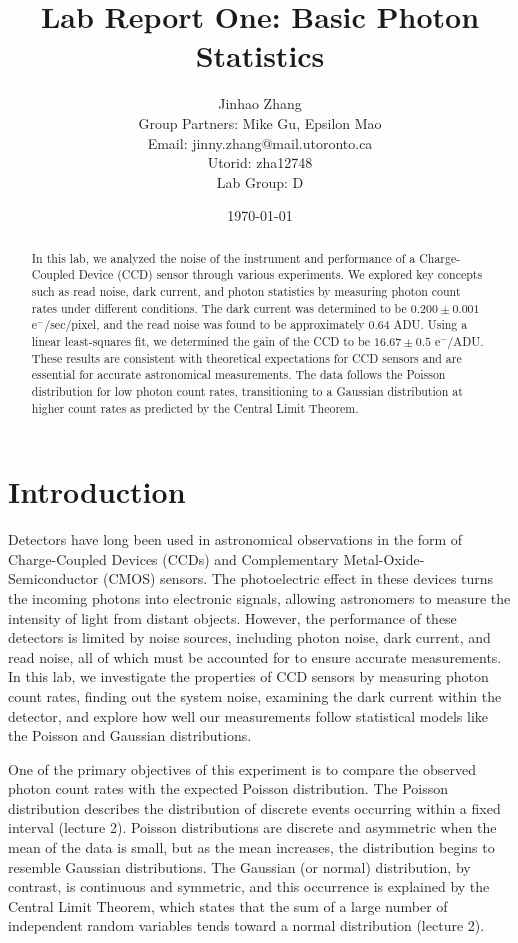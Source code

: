 \documentclass[10pt, preprint]{aastex}
\title{Lab Report One: Basic Photon Statistics}
\author{
Jinhao Zhang \\
Group Partners: Mike Gu, Epsilon Mao \\
Email: jinny.zhang@mail.utoronto.ca \\
Utorid: zha12748 \\
Lab Group: D \\
}
\date{\centering \today}
\begin{document}
\begin{abstract}
In this lab, we analyzed the noise of the instrument and performance of a Charge-Coupled Device (CCD) sensor through various experiments. We explored key concepts such as read noise, dark current, and photon statistics by measuring photon count rates under different conditions. The dark current was determined to be $0.200 \pm 0.001$ e$^-$/sec/pixel, and the read noise was found to be approximately 0.64 ADU. Using a linear least-squares fit, we determined the gain of the CCD to be $16.67 \pm 0.5$ e$^-$/ADU. These results are consistent with theoretical expectations for CCD sensors and are essential for accurate astronomical measurements. The data follows the Poisson distribution for low photon count rates, transitioning to a Gaussian distribution at higher count rates as predicted by the Central Limit Theorem.
\end{abstract}

\maketitle


\section{Introduction}
Detectors have long been used in astronomical observations in the form of Charge-Coupled Devices (CCDs) and Complementary Metal-Oxide-Semiconductor (CMOS) sensors. The photoelectric effect in these devices turns the incoming photons into electronic signals, allowing astronomers to measure the intensity of light from distant objects. However, the performance of these detectors is limited by noise sources, including photon noise, dark current, and read noise, all of which must be accounted for to ensure accurate measurements. In this lab, we investigate the properties of CCD sensors by measuring photon count rates, finding out the system noise, examining the dark current within the detector, and explore how well our measurements follow statistical models like the Poisson and Gaussian distributions.

One of the primary objectives of this experiment is to compare the observed photon count rates with the expected Poisson distribution. The Poisson distribution describes the distribution of discrete events occurring within a fixed interval (lecture 2). Poisson distributions are discrete and asymmetric when the mean of the data is small, but as the mean increases, the distribution begins to resemble Gaussian distributions. The Gaussian (or normal) distribution, by contrast, is continuous and symmetric, and this occurrence is explained by the Central Limit Theorem, which states that the sum of a large number of independent random variables tends toward a normal distribution (lecture 2).
\end{document}
